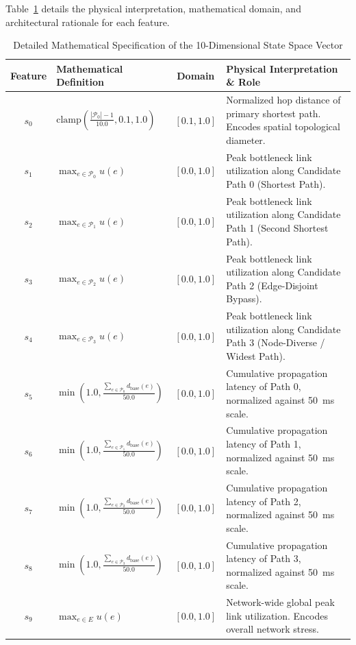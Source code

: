 \documentclass[12pt,a4paper,oneside]{report}
\begin{document}
Table~\ref{tab:state_features_breakdown} details the physical interpretation, mathematical domain, and architectural rationale for each feature.

\begin{table}[htbp]
\centering
\caption{Detailed Mathematical Specification of the 10-Dimensional State Space Vector}
\label{tab:state_features_breakdown}
\small
\begin{tabularx}{\textwidth}{c l c X}
\toprule
\textbf{Feature} & \textbf{Mathematical Definition} & \textbf{Domain} & \textbf{Physical Interpretation \& Role} \\
\midrule
$s_0$ & $\text{clamp}\left(\frac{|\mathcal{P}_0| - 1}{10.0}, 0.1, 1.0\right)$ & $[0.1, 1.0]$ & Normalized hop distance of primary shortest path. Encodes spatial topological diameter. \\
\addlinespace
$s_1$ & $\max_{e \in \mathcal{P}_0} u(e)$ & $[0.0, 1.0]$ & Peak bottleneck link utilization along Candidate Path 0 (Shortest Path). \\
\addlinespace
$s_2$ & $\max_{e \in \mathcal{P}_1} u(e)$ & $[0.0, 1.0]$ & Peak bottleneck link utilization along Candidate Path 1 (Second Shortest Path). \\
\addlinespace
$s_3$ & $\max_{e \in \mathcal{P}_2} u(e)$ & $[0.0, 1.0]$ & Peak bottleneck link utilization along Candidate Path 2 (Edge-Disjoint Bypass). \\
\addlinespace
$s_4$ & $\max_{e \in \mathcal{P}_3} u(e)$ & $[0.0, 1.0]$ & Peak bottleneck link utilization along Candidate Path 3 (Node-Diverse / Widest Path). \\
\addlinespace
$s_5$ & $\min\left(1.0, \frac{\sum_{e \in \mathcal{P}_0} d_{\text{base}}(e)}{50.0}\right)$ & $[0.0, 1.0]$ & Cumulative propagation latency of Path 0, normalized against 50~ms scale. \\
\addlinespace
$s_6$ & $\min\left(1.0, \frac{\sum_{e \in \mathcal{P}_1} d_{\text{base}}(e)}{50.0}\right)$ & $[0.0, 1.0]$ & Cumulative propagation latency of Path 1, normalized against 50~ms scale. \\
\addlinespace
$s_7$ & $\min\left(1.0, \frac{\sum_{e \in \mathcal{P}_2} d_{\text{base}}(e)}{50.0}\right)$ & $[0.0, 1.0]$ & Cumulative propagation latency of Path 2, normalized against 50~ms scale. \\
\addlinespace
$s_8$ & $\min\left(1.0, \frac{\sum_{e \in \mathcal{P}_3} d_{\text{base}}(e)}{50.0}\right)$ & $[0.0, 1.0]$ & Cumulative propagation latency of Path 3, normalized against 50~ms scale. \\
\addlinespace
$s_9$ & $\max_{e \in E} u(e)$ & $[0.0, 1.0]$ & Network-wide global peak link utilization. Encodes overall network stress. \\
\bottomrule
\end{tabularx}
\end{table}
\end{document}
